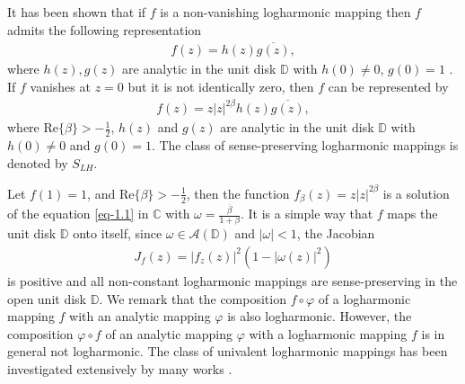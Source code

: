 \documentclass[a4paper,12pt]{amsart}
\theoremstyle{plain}
\theoremstyle{definition}
\newcounter {own}
\begin{document}
It has been shown that if $f$ is a non-vanishing logharmonic mapping then $f$ admits the following representation
\begin{align}\label{eq-1.2}
	f(z)=h(z)\overline{g(z)},
\end{align}
where $h(z), g(z)$ are analytic in the unit disk $\mathbb{D}$ with $h(0)\neq 0$, $g(0)=1$ \cite{Abdulhadi-Bshouty-TAMS-1988}. If $f$ vanishes at $z =0$ but it is not identically zero, then $f$ can be represented by
\begin{align}\label{eq-1.3}
	f(z)=z|z|^{2\beta}h(z)\overline{g(z)},
\end{align}
where $\mathrm{Re}\{\beta\}>- \frac{1}{2}$, $h(z)$ and $g(z)$ are analytic in the unit disk $\mathbb{D}$ with $h(0)\neq 0$ and $g(0)=1$. The class of sense-preserving logharmonic mappings is denoted by $S_{LH}$. \vspace{1.5mm}

Let $f(1)=1$, and $\mathrm{Re}\{\beta\}>-\frac{1}{2}$, then the function $f_{\beta}(z)=z|z|^{2\beta}$ is a solution of the equation \eqref{eq-1.1} in $\mathbb{C}$ with $\omega=\frac{\overline{\beta}} {1+\beta}$. It is a simple way that $f$ maps the unit disk $\mathbb{D}$ onto itself, since $\omega\in\mathcal{A}(\mathbb{D})$ and $|\omega|<1$, the Jacobian
\begin{align*}
	J_f(z)= |f_z(z)|^2\left(1-|\omega(z)|^2\right)
\end{align*}
is positive and all non-constant logharmonic mappings are sense-preserving in the open unit disk $\mathbb{D}$. We remark that the composition $f\circ\varphi$ of a logharmonic mapping $f$ with an analytic mapping $\varphi$ is also logharmonic. However, the composition $\varphi\circ f$ of an analytic mapping $\varphi$ with
a logharmonic mapping $f$ is in general not logharmonic. The class of univalent logharmonic mappings has been investigated extensively by many works \cite{Abdulhadi-Bshouty-TAMS-1988,Abdulhadi-IJM-1996, Abdulhadi-IJM-2002}. \vspace{1.5mm}
\end{document}
